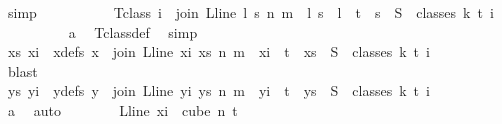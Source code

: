 \begin{isabellebody}
\ simp\isanewline
\ \ \ \ \ \ \isamarkupfalse%
\ \isamarkupfalse%
\ {\isacharasterisk}{\kern0pt}{\isacharasterisk}{\kern0pt}{\isacharcolon}{\kern0pt}\ {\isachardoublequoteopen}T{\isacharunderscore}{\kern0pt}class\ i\ {\isacharequal}{\kern0pt}\ {\isacharbraceleft}{\kern0pt}join\ {\isacharparenleft}{\kern0pt}L{\isacharunderscore}{\kern0pt}line\ l{\isacharparenright}{\kern0pt}\ s\ n\ m\ {\isacharbar}{\kern0pt}\ l\ s\ {\isachardot}{\kern0pt}\ l\ {\isasymin}\ {\isacharbraceleft}{\kern0pt}{\isachardot}{\kern0pt}{\isachardot}{\kern0pt}{\isacharless}{\kern0pt}t{\isacharbraceright}{\kern0pt}\ {\isasymand}\ s\ {\isasymin}\ S\ {\isacharbackquote}{\kern0pt}\ {\isacharparenleft}{\kern0pt}classes\ k\ t\ i{\isacharparenright}{\kern0pt}{\isacharbraceright}{\kern0pt}{\isachardoublequoteclose}\ \isanewline
\ \ \ \ \ \ \ \ \isamarkupfalse%
\ a\ \isamarkupfalse%
\ T{\isacharunderscore}{\kern0pt}class{\isacharunderscore}{\kern0pt}def\ \isamarkupfalse%
\ simp\isanewline
\ \ \ \ \ \ \isamarkupfalse%
\ \isamarkupfalse%
\ xs\ xi\ \ xdefs{\isacharcolon}{\kern0pt}\ {\isachardoublequoteopen}x\ {\isacharequal}{\kern0pt}\ join\ {\isacharparenleft}{\kern0pt}L{\isacharunderscore}{\kern0pt}line\ xi{\isacharparenright}{\kern0pt}\ xs\ n\ m\ {\isasymand}\ xi\ {\isacharless}{\kern0pt}\ t\ {\isasymand}\ xs\ {\isasymin}\ S\ {\isacharbackquote}{\kern0pt}\ {\isacharparenleft}{\kern0pt}classes\ k\ t\ i{\isacharparenright}{\kern0pt}{\isachardoublequoteclose}\isanewline
\ \ \ \ \ \ \ \ \isamarkupfalse%
\ blast\isanewline
\isanewline
\ \ \ \ \ \ \isamarkupfalse%
\ {\isacharasterisk}{\kern0pt}\ {\isacharasterisk}{\kern0pt}{\isacharasterisk}{\kern0pt}\ \isamarkupfalse%
\ ys\ yi\ \ ydefs{\isacharcolon}{\kern0pt}\ {\isachardoublequoteopen}y\ {\isacharequal}{\kern0pt}\ join\ {\isacharparenleft}{\kern0pt}L{\isacharunderscore}{\kern0pt}line\ yi{\isacharparenright}{\kern0pt}\ ys\ n\ m\ {\isasymand}\ yi\ {\isacharless}{\kern0pt}\ t\ {\isasymand}\ ys\ {\isasymin}\ S\ {\isacharbackquote}{\kern0pt}\ {\isacharparenleft}{\kern0pt}classes\ k\ t\ i{\isacharparenright}{\kern0pt}{\isachardoublequoteclose}\isanewline
\ \ \ \ \ \ \ \ \isamarkupfalse%
\ a\ \isamarkupfalse%
\ auto\isanewline
\isanewline
\ \ \ \ \ \ \isamarkupfalse%
\ {\isachardoublequoteopen}{\isacharparenleft}{\kern0pt}L{\isacharunderscore}{\kern0pt}line\ xi{\isacharparenright}{\kern0pt}\ {\isasymin}\ cube\ n\ {\isacharparenleft}{\kern0pt}t{\isacharplus}{\kern0pt}{}{\isacharparenright}{\kern0pt}{\isachardoublequoteclose}\ \isamarkupfalse%

\end{isabellebody}
